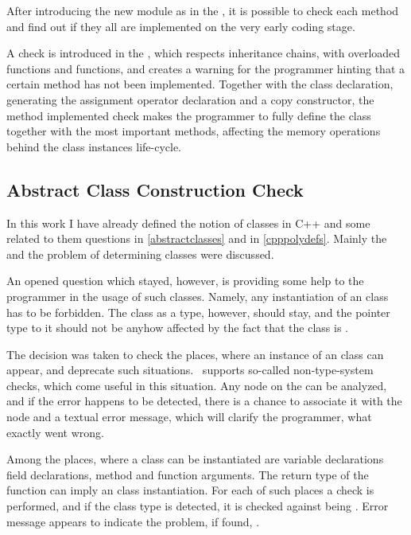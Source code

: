 After introducing the new module  as in the , it is possible to check each method and find out if they all 
are implemented on the very early coding stage.

A check is introduced in the \pcpp, which respects inheritance chains, with overloaded functions and  functions,
and creates a warning for the programmer hinting that a certain method has not been implemented. Together with the class declaration, 
generating the assignment operator declaration and a copy constructor, the method implemented check makes the programmer to 
fully define the class together with the most important methods, affecting the memory operations behind the class instances life-cycle.


\subsection{Abstract Class Construction Check}

In this work I have already defined the notion of  classes in C++ and some related to them questions in \ref{abstractclasses} and
in \ref{cpppolydefs}. Mainly the  and the problem of determining  classes were discussed.



An opened question which stayed, however, is providing some help to the programmer in the usage of such classes. Namely, any instantiation
of an  class has to be forbidden. The  class as a type, however, should stay, and the pointer type to it should not
be anyhow affected by the fact that the class is .

The decision was taken to check the places, where an instance of an  class can appear, and deprecate such situations.
\jbmps\ supports so-called non-type-system checks, which come useful in this situation. Any node on the  can be analyzed, and 
if the error happens to be detected, there is a chance to associate it with the node and a textual error message, which will
clarify the programmer, what exactly went wrong. 

Among the places, where a class can be instantiated are variable declarations field declarations, method and function arguments.
The return type of the function can imply an  class instantiation. For each of such places a check is performed, 
and if the class type is detected, it is checked against being . Error message appears to indicate the problem, 
if found, . 

